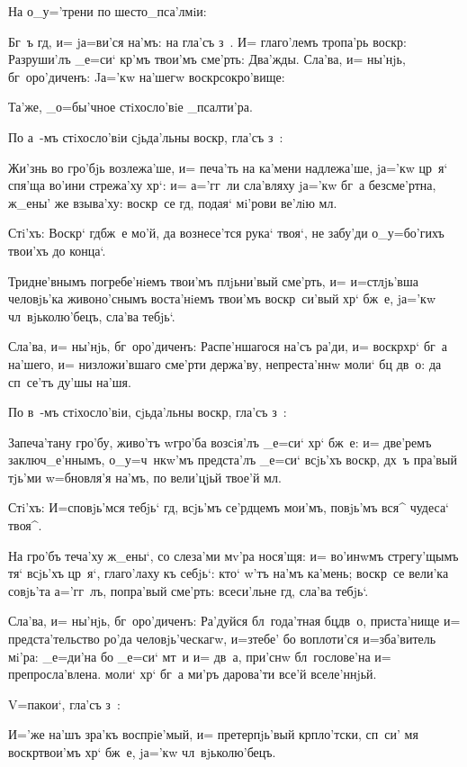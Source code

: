 На о_у='трени по шесто_пса'лмiи:

Бг~ъ гд, и= jа=ви'ся на'мъ: на гла'съ з~. И= 
глаго'лемъ тропа'рь воскр: Разруши'лъ _е=си` 
кр'мъ твои'мъ сме'рть: Два'жды. Сла'ва, и= ны'нjь, 
бг~оро'диченъ: Jа='кw на'шегw воскр сокро'вище:

Та'же, _о=бы'чное стiхосло'вiе _псалти'ра.

По а~-мъ стiхосло'вiи сjьда'льны воскр, гла'съ з~:

Жи'знь во гро'бjь возлежа'ше, и= печа'ть на ка'мени 
надлежа'ше, jа='кw цр~я` спя'ща во'ини стрежа'ху хр`: 
и= а='гг~ли сла'вляху jа='кw бг~а безсме'ртна, ж_ены' же 
взыва'ху: воскр~се гд, подая` мi'рови ве'лiю мл.

Стi'хъ: Воскр` гд бж~е мо'й, да вознесе'тся 
рука` твоя`, не забу'ди о_у=бо'гихъ твои'хъ до конца`.

Тридне'внымъ погребе'нiемъ твои'мъ плjьни'вый сме'рть, 
и= и=стлjь'вша человjь'ка живоно'снымъ воста'нiемъ 
твои'мъ воскр~си'вый хр` бж~е, jа='кw 
чл~вjьколю'бецъ, сла'ва тебjь`.

Сла'ва, и= ны'нjь, бг~оро'диченъ: Распе'ншагося на'съ 
ра'ди, и= воскр хр` бг~а на'шего, и= 
низложи'вшаго сме'рти держа'ву, непреста'ннw моли` бц 
дв~о: да сп~се'тъ ду'шы на'шя.

По в~-мъ стiхосло'вiи, сjьда'льны воскр, гла'съ 
з~:

Запеча'тану гро'бу, живо'тъ w\т гро'ба возсiя'лъ 
_е=си` хр` бж~е: и= две'ремъ заключ_е'ннымъ, 
о_у=ч~нкw'мъ предста'лъ _е=си` всjь'хъ воскр, дх~ъ 
пра'вый тjь'ми w=бновля'я на'мъ, по вели'цjьй твое'й 
мл.

Стi'хъ: И=сповjь'мся тебjь` гд, всjь'мъ се'рдцемъ 
мои'мъ, повjь'мъ вся^ чудеса` твоя^.

На гро'бъ теча'ху ж_ены`, со слеза'ми мv'ра нося'щя: 
и= во'инwмъ стрегу'щымъ тя` всjь'хъ цр~я`, глаго'лаху къ 
себjь`: кто` w'тъ на'мъ ка'мень; воскр~се вели'ка 
совjь'та а='гг~лъ, попра'вый сме'рть: всеси'льне гд, 
сла'ва тебjь`.

Сла'ва, и= ны'нjь, бг~оро'диченъ: Ра'дуйся 
бл~года'тная бц дв~о, приста'нище и= предста'тельство 
ро'да человjь'ческагw, и=з\ъ тебе' бо воплоти'ся 
и=зба'витель мi'ра: _е=ди'на бо _е=си` мт~и и= дв~а, 
при'снw бл~гослове'на и= препросла'влена. моли` хр` 
бг~а ми'ръ дарова'ти все'й вселе'ннjьй.

V=пакои`, гла'съ з~:

И='же на'шъ зра'къ воспрiе'мый, и= претерпjь'вый 
кр пло'тски, сп~си' мя воскр твои'мъ хр` 
бж~е, jа='кw чл~вjьколю'бецъ.

